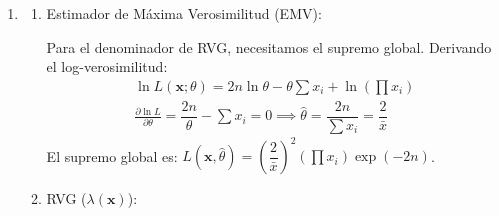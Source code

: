 \begin{enumerate}[label=\color{red}\textbf{\arabic*)}]
\begin{enumerate}[label=\color{red}\textbf{\alph*)}]
		            \begin{enumerate}[label=\arabic*)]
			            \item Momentos bajo $H_0$:

			                  Si $\theta_0=1$, la distribución es una $Gamma(2, 1)$. Sus momentos teóricos son: \[
				                  \mu=\dfrac{2}{\theta}=2\text{ y }\sigma^2=\dfrac{2}{\theta^2}=2
			                  \]
			            \item Tipificación del estadístico:

			                  Usando el Teorema Central del Límite (para $n=20$), la distribución muestral de $\bar{X}$ se aproxima a $\mathcal{N}(\mu,\sigma^2 / n)=\mathcal{N}(2, 2 / 20)=\mathcal{N}(2,0.1)$.

			                  El valor tipificado observado es: \[
				                  z_{obs}=\dfrac{\bar{X}-\mu}{\sigma / \sqrt{n} }=\dfrac{1.2-2}{\sqrt{0.1} }=\dfrac{-0.8}{0.3162}\approx -2.53
			                  \]
			            \item Cálculo del $p$-valor:

			                  Como la región de rechazo demostrada en  se encuentra en la cola inferior $(\bar{X}\le c^*)$, el $p$-valor se calcula como: \[
				                  p\text{-valor}=P(Z\le -2.53)=1-P(Z\ge 2.53)\approx 1-0.9943=0.0057
			                  \]
		            \end{enumerate}
		      \item {}
		            \begin{enumerate}[label=\arabic*)]
			            \item Estimador de Máxima Verosimilitud (EMV):

			                  Para el denominador de RVG, necesitamos el supremo global. Derivando el log-verosimilitud: \[
				                  \begin{array}{c}
					                  \ln L(\mathbf{x};\theta)=2n \ln\theta-\theta \sum x_{i}+\ln \left( \prod x_{i} \right) \\
					                  \frac{\partial \ln L}{\partial \theta} =\dfrac{2n}{\theta}-\sum x_{i}=0\implies\hat{\theta}=\dfrac{2n}{\sum x_{i}}=\dfrac{2}{\bar{x}}
				                  \end{array}
			                  \]
			                  El supremo global es: $L(\mathbf{x},\hat{\theta})=\left( \dfrac{2}{\bar{x}} \right) ^2 \left( \prod x_{i} \right) \exp(-2n)$.
			            \item RVG ($\lambda(\mathbf{x})$):


\end{enumerate}
\end{enumerate}
\end{enumerate}
